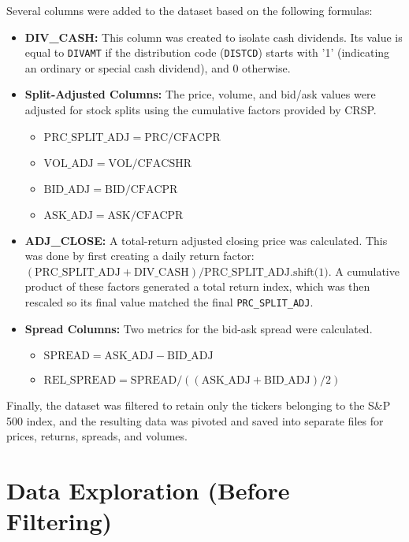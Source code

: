 \documentclass[11pt, letterpaper]{article}
\begin{document}
Several columns were added to the dataset based on the following formulas:
\begin{itemize}
    \item \textbf{DIV\_CASH:} This column was created to isolate cash dividends. Its value is equal to \texttt{DIVAMT} if the distribution code (\texttt{DISTCD}) starts with '1' (indicating an ordinary or special cash dividend), and 0 otherwise.
    
    \item \textbf{Split-Adjusted Columns:} The price, volume, and bid/ask values were adjusted for stock splits using the cumulative factors provided by CRSP.
    \begin{itemize}
        \item $\text{PRC\_SPLIT\_ADJ} = \text{PRC} / \text{CFACPR}$
        \item $\text{VOL\_ADJ} = \text{VOL} / \text{CFACSHR}$
        \item $\text{BID\_ADJ} = \text{BID} / \text{CFACPR}$
        \item $\text{ASK\_ADJ} = \text{ASK} / \text{CFACPR}$
    \end{itemize}
    
    \item \textbf{ADJ\_CLOSE:} A total-return adjusted closing price was calculated. This was done by first creating a daily return factor: $(\text{PRC\_SPLIT\_ADJ} + \text{DIV\_CASH}) / \text{PRC\_SPLIT\_ADJ.shift(1)}$. A cumulative product of these factors generated a total return index, which was then rescaled so its final value matched the final \texttt{PRC\_SPLIT\_ADJ}.
    
    \item \textbf{Spread Columns:} Two metrics for the bid-ask spread were calculated.
    \begin{itemize}
        \item $\text{SPREAD} = \text{ASK\_ADJ} - \text{BID\_ADJ}$
        \item $\text{REL\_SPREAD} = \text{SPREAD} / ((\text{ASK\_ADJ} + \text{BID\_ADJ}) / 2)$
    \end{itemize}
\end{itemize}
Finally, the dataset was filtered to retain only the tickers belonging to the S\&P 500 index, and the resulting data was pivoted and saved into separate files for prices, returns, spreads, and volumes.

\section{Data Exploration (Before Filtering)}
\end{document}
